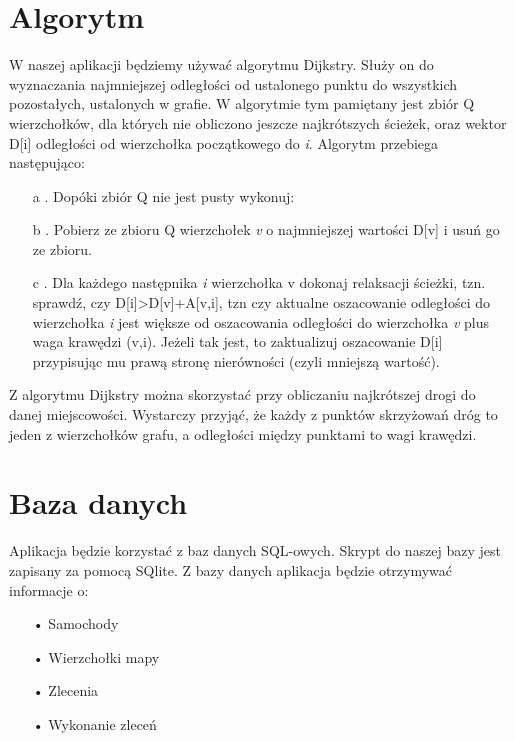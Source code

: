 \documentclass[11pt,a4paper]{mwart}
\begin{document}
\section{Algorytm}
W naszej aplikacji będziemy używać algorytmu Dijkstry. Służy on do wyznaczania najmniejszej odległości od ustalonego punktu do wszystkich pozostałych, ustalonych w grafie. W algorytmie tym pamiętany jest zbiór Q wierzchołków, dla których nie obliczono jeszcze najkrótszych ścieżek, oraz wektor D[i] odległości od wierzchołka początkowego do \textit{i}. Algorytm przebiega następująco:
\begin{flushleft}
\begin{enumerate}
\item[a]. Dopóki zbiór Q nie jest pusty wykonuj:
\item[b]. Pobierz ze zbioru Q wierzchołek \textit{v} o najmniejszej wartości D[v] i usuń go ze zbioru.
\item[c]. Dla każdego następnika \textit{i} wierzchołka v dokonaj relaksacji ścieżki, tzn. sprawdź, czy D[i]>D[v]+A[v,i], tzn czy aktualne oszacowanie odległości do wierzchołka \textit{i} jest większe od oszacowania odległości do wierzchołka \textit{v} plus waga krawędzi (v,i).
Jeżeli tak jest, to zaktualizuj oszacowanie D[i] przypisując mu prawą stronę nierówności (czyli mniejszą wartość).\\
\end{enumerate}
\end{flushleft}
Z algorytmu Dijkstry można skorzystać przy obliczaniu najkrótszej drogi do danej miejscowości. Wystarczy przyjąć, że każdy z punktów skrzyżowań dróg to jeden z wierzchołków grafu, a odległości między punktami to wagi krawędzi.
\section{Baza danych}
Aplikacja będzie korzystać z baz danych SQL-owych. Skrypt do naszej bazy jest zapisany za pomocą SQlite.
Z bazy danych aplikacja będzie otrzymywać informacje o:
\begin{enumerate}
\item[• Samochody]
\item[• Wierzchołki mapy]
\item[• Zlecenia]
\item[• Wykonanie zleceń]
\end{enumerate}
\end{document}
